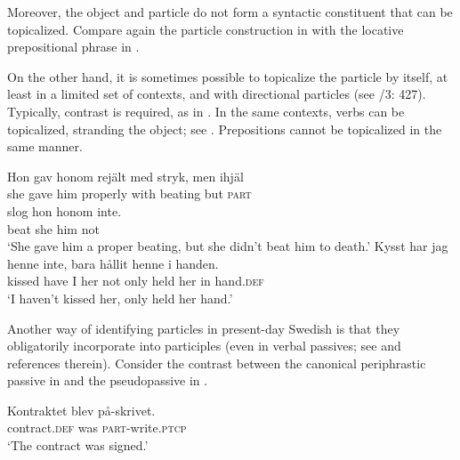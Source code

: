 \documentclass[output=paper]{langscibook}
\begin{document}
Moreover, the object and particle do not form a syntactic constituent that can be topicalized. Compare again the particle construction in  with the locative prepositional phrase in .


\ea\label{ex:lalu:11}
\z
\z


On the other hand, it is sometimes possible to topicalize the particle by itself, at least in a limited set of contexts, and with directional particles (see \citealt{TelemanEtAl1999}/3: 427). Typically, contrast is required, as in . In the same contexts, verbs can be topicalized, stranding the object; see . Prepositions cannot be topicalized in the same manner.


\ea\label{ex:lalu:12}
\gll  Hon   gav     honom   rejält       med   stryk,     men   ihjäl\\
she     gave     him   properly     with   beating     but     \textsc{part}\\

\gll  slog   hon  honom  inte. \\
beat   she   him     not\\
\glt `She gave him a proper beating, but she didn’t beat him to death.'
\ex\label{ex:lalu:13}
\gll  Kysst     har   jag   henne   inte,   bara   hållit  henne   i     handen.\\
kissed   have   I   her     not     only   held   her   in   hand\textsc{.def}\\
\glt `I haven’t kissed her, only held her hand.' \citep{Holmberg1997}\\
\z


Another way of identifying particles in present-day Swedish is that they obligatorily incorporate into participles (even in verbal passives; see \citealt{Lundquist2014Passives} and references therein). Consider the contrast between the canonical periphrastic passive in  and the pseudopassive in .


\ea\label{ex:lalu:14}
\ea\label{ex:lalu:14a}
\gll  Kontraktet   blev   på-skrivet.\\
    contract\textsc{.def}   was   \textsc{part-}write.\textsc{ptcp}\\
\glt `The contract was signed.'
\end{document}
